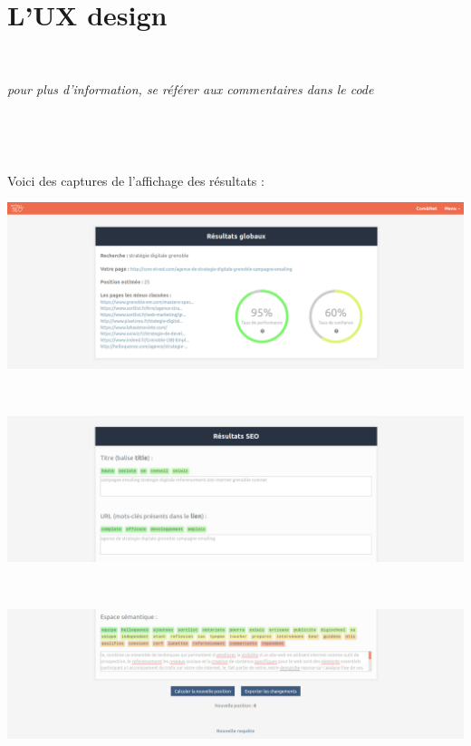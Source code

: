 \documentclass[12pt]{article}
\begin{document}

\newpage
\section{L'UX design}

\

\textit{pour plus d'information, se référer aux commentaires dans le code}

\

\

Voici des captures de l'affichage des résultats :

\begin{center}
\includegraphics[scale=0.25]{hautDePage.png}

\

\includegraphics[scale=0.25]{milieuDePage.png}

\

\includegraphics[scale=0.25]{basDePage.png}

\

\end{center}
\end{document}
